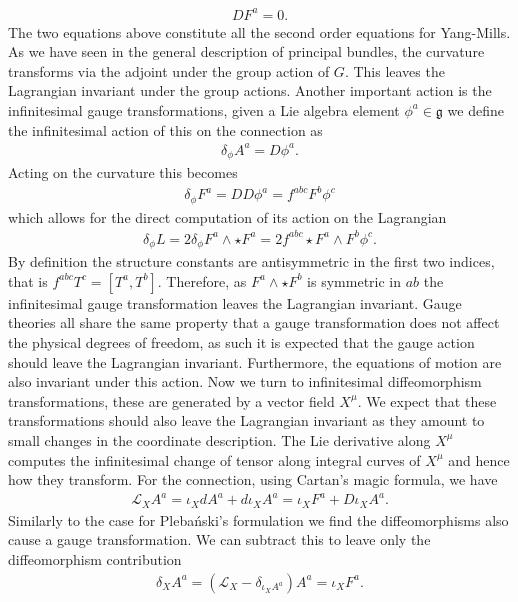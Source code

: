 \documentclass[10pt]{report}
\newcommand{\pleb}[0]{Pleba\'nski}
\theoremstyle{definition}
\begin{document}
\begin{align}
    D F^a = 0.
\end{align}
The two equations above constitute all the second order equations for Yang-Mills. As we have seen in the general description of principal bundles, the curvature transforms via the adjoint under the group action of $G$. This leaves the Lagrangian invariant under the group actions. Another important action is the infinitesimal gauge transformations, given a Lie algebra element $\phi^a \in \mathfrak{g}$ we define the infinitesimal action of this on the connection as 
\begin{align}
    \delta_\phi A^a = D \phi^a.
\end{align}
Acting on the curvature this becomes 
\begin{align}
    \delta_\phi F^a= D D \phi^a = f^{abc} F^b \phi^c
\end{align}
which allows for the direct computation of its action on the Lagrangian 
\begin{align}
    \delta_\phi L = 2 \delta_\phi F^a \wedge \star F^a = 2 f^{abc} \star F^a \wedge F^b \phi^c.
\end{align}
By definition the structure constants are antisymmetric in the first two indices, that is $f^{abc} T^c = [T^a,T^b]$. Therefore, as $F^a \wedge \star F^b$ is symmetric in $ab$ the infinitesimal gauge transformation leaves the Lagrangian invariant. Gauge theories all share the same property that a gauge transformation does not affect the physical degrees of freedom, as such it is expected that the gauge action should leave the Lagrangian invariant. Furthermore, the equations of motion are also invariant under this action. Now we turn to infinitesimal diffeomorphism transformations, these are generated by a vector field $X^\mu$. We expect that these transformations should also leave the Lagrangian invariant as they amount to small changes in the coordinate description. The Lie derivative along $X^\mu$ computes the infinitesimal change of tensor along integral curves of $X^\mu$ and hence how they transform. For the connection, using Cartan's magic formula, we have 
\begin{align}
    \mathcal{L}_X A^a = \iota_X d A^a + d \iota_X A^a = \iota_X F^a + D \iota_X A^a.
\end{align}
Similarly to the case for \pleb{}'s formulation we find the diffeomorphisms also cause a gauge transformation. We can subtract this to leave only the diffeomorphism contribution
\begin{align}
    \delta_X A^a = (\mathcal{L}_{X} - \delta_{\iota_X A^a}) A^a = \iota_X F^a.
\end{align}
\end{document}
